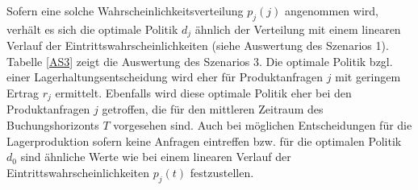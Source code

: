Sofern eine solche Wahrscheinlichkeitsverteilung $p_j(j)$ angenommen wird, verhält es sich die optimale Politik $d_j$ ähnlich der Verteilung mit einem linearen Verlauf der Eintrittswahrscheinlichkeiten (siehe Auswertung des Szenarios 1). Tabelle \ref{AS3} zeigt die Auswertung des Szenarios 3. Die optimale Politik bzgl. einer Lagerhaltungsentscheidung wird eher für Produktanfragen $j$ mit geringem Ertrag $r_j$ ermittelt. Ebenfalls wird diese optimale Politik eher bei den Produktanfragen $j$ getroffen, die für den mittleren Zeitraum des Buchungshorizonts $T$ vorgesehen sind. Auch bei möglichen Entscheidungen für die Lagerproduktion sofern keine Anfragen eintreffen bzw. für die optimalen Politik $d_0$ sind ähnliche Werte wie bei einem linearen Verlauf der Eintrittswahrscheinlichkeiten $p_j(t)$ festzustellen.\\[30mm]
\newpage

